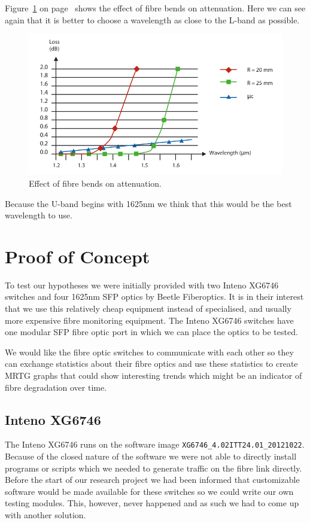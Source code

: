 \documentclass{article}
\begin{document}
Figure~\ref{fig:attenuation-bends} on page~\pageref{fig:attenuation-bends} shows the effect of fibre bends on attenuation. Here we can see again that it is better to choose a wavelength as close to the L-band as possible.
\begin{figure}[h]
\centerline{\includegraphics[scale=0.3, trim = 0mm 0mm 0mm 0mm]{images/attenuation-bends.png}}
\caption{Effect of fibre bends on attenuation.\cite[p. 27]{refguide:2011}}
\label{fig:attenuation-bends}
\end{figure}

Because the U-band begins with 1625nm we think that this would be the best wavelength to use.

\newpage
\section{Proof of Concept}
To test our hypotheses we were initially provided with two Inteno XG6746\cite{Inteno:XG6746} switches and four 1625nm SFP optics by Beetle Fiberoptics.
It is in their interest that we use this relatively cheap equipment instead of specialised, and usually more expensive fibre monitoring equipment.
The Inteno XG6746 switches have one modular SFP fibre optic port in which we can place the optics to be tested. 

We would like the fibre optic switches to communicate with each other so they can exchange statistics about their fibre optics and use these statistics to create MRTG\cite{MRTG:MRTG} graphs that could show interesting trends which might be an indicator of fibre degradation over time.

\subsection{Inteno XG6746}
The Inteno XG6746 runs on the software image \texttt{XG6746\_4.02ITT24.01\_20121022}.
Because of the closed nature of the software we were not able to directly install programs or scripts which we needed to generate traffic on the fibre link directly.
Before the start of our research project we had been informed that customizable software would be made available for these switches so we could write our own testing modules.
This, however, never happened and as such we had to come up with another solution.
\end{document}
